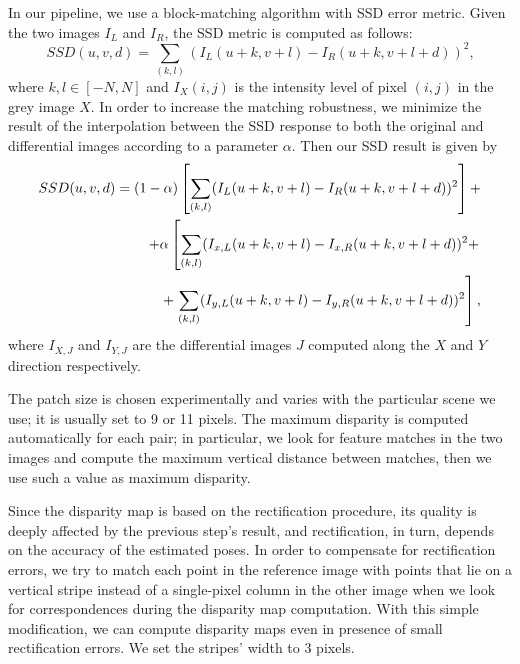 In our pipeline, we use a block-matching algorithm with SSD error metric.
Given the two images $I_L$ and $I_R$, the SSD metric is computed as follows:
\begin{equation*}
SSD(u, v, d) = \sum_{(k, l)}(I_L(u + k, v + l) - I_R(u + k, v + l + d))^2	\textit{,}
\end{equation*}
\noindent where $k, l \in [-N, N]$ and $I_X(i, j)$ is the intensity level
of pixel $(i,j)$ in the grey image $X$.
In order to increase the matching robustness, we minimize the result of the
interpolation between the SSD response to both the original and differential 
images according to a parameter $\alpha$. 
Then our SSD result is given by
\begin{equation*}
\begin{split}
SSD(u, v, d) = (1 - \alpha) \left[ \sum_{(k, l)}(I_L(u + k, v + l) - I_R(u + k, v + l + d))^2\right] + \\
	 + \alpha\left[ \sum_{(k, l)}(I_{x,L}(u + k, v + l) - I_{x,R}(u + k, v + l + d))^2 + \right. \\
	 + \left. \sum_{(k, l)}(I_{y,L}(u + k, v + l) - I_{y,R}(u + k, v + l + d))^2 \vphantom{\sum_{(k, l)}} \right] \text{,}
\end{split}
\end{equation*}
%
\noindent where $I_{X, J}$ and $I_{Y, J}$ are the differential images $J$
computed along the $X$ and $Y$ direction respectively.

The patch size is chosen experimentally and varies with the particular scene
we use; it is usually set to 9 or 11 pixels.
The maximum disparity is computed automatically for each pair; in particular,
we look for feature matches in the two images and compute the maximum vertical
distance between matches, then we use such a value as maximum disparity.

Since the disparity map is based on the rectification procedure, its quality
is deeply affected by the previous step's result, and rectification, in turn,
depends on the accuracy of the estimated poses. In order to compensate for
rectification errors, we try to match each point in the reference image with points that
lie on a vertical stripe instead of a single-pixel column in the other image
when we look for correspondences during the disparity map
computation. With this simple modification, we can compute disparity maps
even in presence of small rectification errors. We set the stripes' width to 3
pixels.

